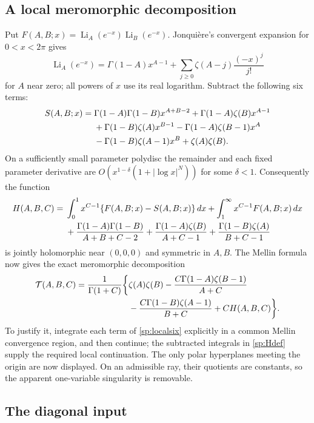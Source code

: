 \subsection{A local meromorphic decomposition}

Put $F(A,B;x)=\operatorname{Li}_A(e^{-x})
                         \operatorname{Li}_B(e^{-x})$.
Jonqui\`ere's convergent expansion for $0<x<2\pi$ gives
\[
 \operatorname{Li}_A(e^{-x})
  =\Gamma(1-A)x^{A-1}
    +\sum_{j\geq0}\zeta(A-j)\frac{(-x)^j}{j!}
\]
for $A$ near zero; all powers of $x$ use its real logarithm.
Subtract the following six terms:
\begin{align}\label{sp:localsix}
 S(A,B;x)={}&\Gamma(1-A)\Gamma(1-B)x^{A+B-2}
   +\Gamma(1-A)\zeta(B)x^{A-1}\notag\\
 &+\Gamma(1-B)\zeta(A)x^{B-1}
   -\Gamma(1-A)\zeta(B-1)x^A\notag\\
 &-\Gamma(1-B)\zeta(A-1)x^B+\zeta(A)\zeta(B).
\end{align}
On a sufficiently small parameter polydisc the remainder and each
fixed parameter derivative are $O(x^{1-\delta}(1+|\log x|^N))$ for
some $\delta<1$.  Consequently the function
\begin{align}\label{sp:Hdef}
 H(A,B,C)={}&\int_0^1 x^{C-1}\{F(A,B;x)-S(A,B;x)\}\,dx
            +\int_1^\infty x^{C-1}F(A,B;x)\,dx\notag\\
 &+\frac{\Gamma(1-A)\Gamma(1-B)}{A+B+C-2}
   +\frac{\Gamma(1-A)\zeta(B)}{A+C-1}
   +\frac{\Gamma(1-B)\zeta(A)}{B+C-1}
\end{align}
is jointly holomorphic near $(0,0,0)$ and symmetric in $A,B$.
The Mellin formula now gives the exact meromorphic decomposition
\begin{align}\label{sp:meromorphicH}
 \mathcal T(A,B,C)=\frac1{\Gamma(1+C)}\biggl\{
  &\zeta(A)\zeta(B)
   -\frac{C\Gamma(1-A)\zeta(B-1)}{A+C}\notag\\
  &-\frac{C\Gamma(1-B)\zeta(A-1)}{B+C}
   +C H(A,B,C)\biggr\}.
\end{align}
To justify it, integrate each term of \eqref{sp:localsix} explicitly
in a common Mellin convergence region, and then continue; the
subtracted integrals in \eqref{sp:Hdef} supply the required local
continuation.  The only polar hyperplanes meeting the origin are now
displayed.  On an admissible ray, their quotients are constants, so
the apparent one-variable singularity is removable.

\subsection{The diagonal input}

